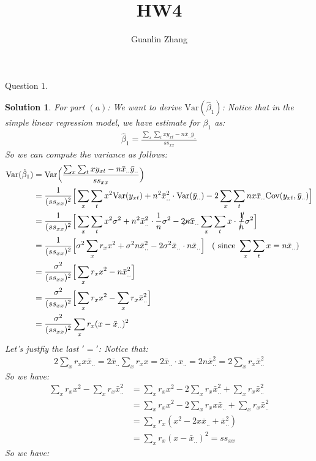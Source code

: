 \documentclass[11pt]{article}
\title{HW4}
\author{Guanlin Zhang}
\newtheorem{sol}{Solution}
\begin{document}
Question $1$.
\begin{sol}
For part $(a)$:\vskip 2mm
We want to derive $\text{Var}(\hat{\beta}_1)$:\vskip 2mm
Notice that in the simple linear regression model, we have estimate for $\beta_1$ as:
\begin{align*}
	\hat{\beta}_1 = \frac{\sum_x\sum_t xy_{xt} - n\bar{x}_{..}\bar{y}_{..}}{ss_{xx}}
\end{align*}
So we can compute the variance as follows:
\begin{align*}
	\text{Var}(\hat{\beta}_1) &= \text{Var}\Big(\frac{\sum_x\sum_t xy_{xt} - n\bar{x}_{..}\bar{y}_{..}}{ss_{xx}}\Big)  \\
	&= \frac{1}{(ss_{xx})^2}\Big[\sum_x\sum_t x^2\text{Var}(y_{xt}) + n^2\bar{x}^2_{..}\cdot \text{Var}(\bar{y}_{..}) - 2\sum_x\sum_t nx\bar{x}_{..}\text{Cov}(y_{xt}, \bar{y}_{..})\Big]\\
	&= \frac{1}{(ss_{xx})^2}\Big[\sum_x\sum_t x^2\sigma^2 + n^2\bar{x}^2_{..}\cdot \frac{1}{n}\sigma^2 - 2\cancel{n}\bar{x}_{..}\sum_x\sum_t x\cdot \cancel{\frac{1}{n}}\sigma^2\Big]\\
	&= \frac{1}{(ss_{xx})^2}\Big[\sigma^2 \sum_x r_x x^2 + \sigma^2n\bar{x}^2_{..} - 2\sigma^2\bar{x}_{..}\cdot n\bar{x}_{..}\Big] \hskip 3mm (\text{ since }\sum_x\sum_t x = n\bar{x}_{..})\\
	&= \frac{\sigma^2}{(ss_{xx})^2}\Big[\sum_x r_x x^2 - n\bar{x}^2_{..}\Big]\\
	&= \frac{\sigma^2}{(ss_{xx})^2}\Big[\sum_x r_x x^2 - \sum_x r_x \bar{x}^2_{..}\Big]\\
	&=  \frac{\sigma^2}{(ss_{xx})^2}\sum_x r_x(x - \bar{x}_{..})^2
\end{align*}
Let's justfiy the last $'='$:\vskip 2mm
Notice that:
\begin{align*}
	2\sum_x r_x x \bar{x}_{..} = 2\bar{x}_{..}\sum_x r_x x = 2\bar{x}_{..} \cdot x_{..}   = 2n\bar{x}^2_{..} = 2\sum_x r_x \bar{x}^2_{..}
\end{align*}
So we have:
\begin{align*}
	\sum_x r_x x^2 - \sum_x r_x \bar{x}^2_{..} &= \sum_x r_x x^2 - 2\sum_x r_x \bar{x}^2_{..} + \sum_x r_x\bar{x}^2_{..}\\
	&= \sum_x r_x x^2 - 2\sum_x r_x x\bar{x}_{..} + \sum_x r_x \bar{x}^2_{..}\\
	&= \sum_x r_x (x^2 - 2x\bar{x}_{..} + \bar{x}^2_{..})\\
	&= \sum_x r_x(x - \bar{x}_{..})^2 = ss_{xx}
\end{align*}
So we have:
\begin{align*}

\end{align*}
\end{sol}
\end{document}
